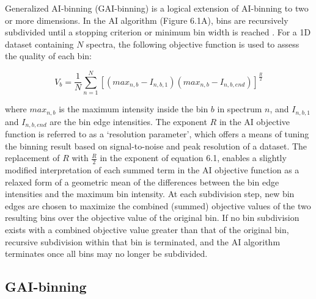 \begin{doublespace}
Generalized AI-binning (GAI-binning) is a logical extension of AI-binning to
two or more dimensions. In the AI algorithm (Figure 6.1A), bins are recursively
subdivided until a stopping criterion or minimum bin width is reached
\cite{demeyer:anchem2008}. For a 1D dataset containing $N$ spectra,
the following objective function is used to assess the quality of each bin:

\begin{equation}
V_b = \frac{1}{N}
  \sum_{n=1}^N \left[
    (max_{n,b} - I_{n,b,1})
    (max_{n,b} - I_{n,b,end}) \right]^\frac{R}{2}
\end{equation}

where $max_{n,b}$ is the maximum intensity inside the bin $b$ in spectrum $n$,
and $I_{n,b,1}$ and $I_{n,b,end}$ are the bin edge intensities. The exponent
$R$ in the AI objective function is referred to as a `resolution parameter',
which offers a means of tuning the binning result based on signal-to-noise and
peak resolution of a dataset. The replacement of $R$ with $\frac{R}{2}$ in the
exponent of equation 6.1, enables a slightly modified interpretation of each
summed term in the AI objective function as a relaxed form of a geometric mean
of the differences between the bin edge intensities and the maximum bin
intensity. At each subdivision step, new bin edges are chosen to maximize the
combined (summed) objective values of the two resulting bins over the objective
value of the original bin. If no bin subdivision exists with a combined
objective value greater than that of the original bin, recursive subdivision
within that bin is terminated, and the AI algorithm terminates once all bins
may no longer be subdivided.
\end{doublespace}

\subsection{GAI-binning}

